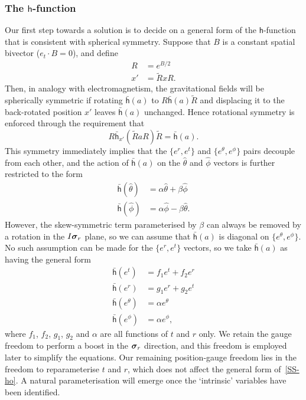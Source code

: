 \documentclass[a4paper]{article}
\numberwithin{equation}{section}
\newcommand{\dt}{\! \cdot \!}
\newcommand{\alp}{\alpha}
\newcommand{\sig}{\mbox{\boldmath $\sigma$}}
\newcommand{\bsig}{\mbox{\boldmath $\sig$}}
\newcommand{\sigr}{\bsig_r}
\newcommand{\Rrev}{\tilde{R}}
\newcommand{\lih}{\mathsf{h}}
\newcommand{\lbh}{\bar{\mathsf{h}}}
\newcommand{\ho}{\lbh}
\newcommand{\hu}{\lih}
\newcommand{\phht}{{\hat{\phi}}}
\newcommand{\thht}{{\hat{\theta}}}
\begin{document}
\subsubsection*{The {\boldmath $\hu$}-function}

Our first step towards a solution is to decide on a general form of
the $\lih$-function that is consistent with spherical symmetry.
Suppose that $B$ is a constant spatial bivector ($e_t\dt B=0$), and
define
%
\begin{align}
R &= e^{B/2} \\
x' &= \Rrev x R.
\end{align}
%
Then, in analogy with electromagnetism, the gravitational fields will
be spherically symmetric if rotating $\ho(a)$ to $R \ho(a) \Rrev$ and
displacing it to the back-rotated position $x'$ leaves $\ho(a)$
unchanged.  Hence rotational symmetry is enforced through the
requirement that 
%
\begin{equation}
R \ho_{x'}(\Rrev a R) \Rrev = \ho(a).
\end{equation}
%
This symmetry immediately implies that the $\{e^r,e^t\}$ and
$\{e^\theta, e^\phi\}$ pairs decouple from each other, and the action
of $\ho(a)$ on the $\thht$ and $\phht$ vectors is further restricted
to the form
%
\begin{equation}
\begin{aligned}
\ho(\thht) &= \alp \thht + \beta \phht \\
\ho(\phht) &= \alp \phht - \beta \thht.
\end{aligned}
\end{equation}
%
However, the skew-symmetric term parameterised by $\beta$ can always
be removed by a rotation in the $I\sigr$ plane, so we can assume that
$\ho(a)$ is diagonal on $\{e^\theta, e^\phi\}$.  No such assumption
can be made for the $\{e^r,e^t\}$ vectors, so we take $\ho(a)$ as
having the general form
%
\begin{equation}
\begin{aligned}
\ho(e^t) &= f_1 e^t + f_2 e^r \\
\ho(e^r) &= g_1 e^r + g_2 e^t \\
\ho(e^\theta) &= \alp e^\theta \\
\ho(e^\phi) &= \alp e^\phi,
\label{SS-ho}
\end{aligned}
\end{equation}
%
where $f_1$, $f_2$, $g_1$, $g_2$ and $\alp$ are all functions of $t$
and $r$ only.  We retain the gauge freedom to perform a boost in the
$\sigr$ direction, and this freedom is employed later to simplify the
equations.  Our remaining position-gauge freedom lies in the freedom
to reparameterise $t$ and $r$, which does not affect the general form
of~\eqref{SS-ho}.  A natural parameterisation will emerge once the
`intrinsic' variables have been identified.
\end{document}
